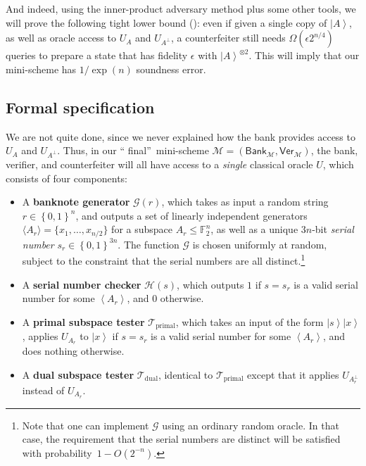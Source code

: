 And indeed, using the inner-product adversary method plus some other tools, we
will prove the following tight lower bound (): even
if given a single copy of $\left\vert A\right\rangle $, as well as oracle
access to $U_{A}$ and $U_{A^{\bot}}$, a counterfeiter still needs
$\Omega\left(\epsilon2^{n/4}\right)$ queries to prepare a state that
has fidelity $\epsilon$ with $\left\vert A\right\rangle ^{\otimes2}%
$. This will imply that our mini-scheme has $1/\exp(n)$ soundness error.

\subsection{Formal specification\label{SPEC}}

We are not quite done, since we never explained how the bank provides access
to $U_{A}$ and $U_{A^{\bot}}$. Thus, in our \textquotedblleft
final\textquotedblright\ mini-scheme $\mathcal{M}=\left(  \mathsf{Bank}%
_{\mathcal{M}},\mathsf{Ver}_{\mathcal{M}}\right)  $, the bank, verifier, and
counterfeiter will all have access to a \emph{single} classical oracle $U$,
which consists of four components:

\begin{itemize}
\item A \textbf{banknote generator} $\mathcal{G}\left(  r\right)  $, which
takes as input a random string $r\in\left\{  0,1\right\}  ^{n}$, and outputs a
set of linearly independent generators $\langle A_{r}\rangle
=\{  x_{1},\ldots,x_{n/2}\}  $ for a subspace $A_{r}\leq
\mathbb{F}_{2}^{n}$, as well as a unique $3n$-bit \emph{serial number}
$s_{r}\in\left\{  0,1\right\}  ^{3n}$. The function $\mathcal{G}$ is chosen
uniformly at random, subject to the constraint that the serial numbers are all
distinct.\footnote{Note that one can implement $\mathcal{G}$ using an
ordinary random oracle. In that case, the requirement that the serial
numbers are distinct will be satisfied with probability\ $1-O\left(
2^{-n}\right)  $.}

\item A \textbf{serial number checker} $\mathcal{H}\left(  s\right)  $, which
outputs $1$ if $s=s_{r}$ is a valid serial number for some $\left\langle
A_{r}\right\rangle $, and $0$ otherwise.

\item A \textbf{primal subspace tester} $\mathcal{T}_{\operatorname*{primal}}%
$, which takes an input of the form $\left\vert s\right\rangle \left\vert
x\right\rangle $, applies $U_{A_{r}}$ to $\left\vert x\right\rangle $ if
$s=s_{r}$ is a valid serial number for some $\left\langle A_{r}\right\rangle
$, and does nothing otherwise.

\item A \textbf{dual subspace tester} $\mathcal{T}_{\operatorname*{dual}}$,
identical to $\mathcal{T}_{\operatorname*{primal}}$ except that it applies
$U_{A_{r}^{\bot}}$ instead of $U_{A_{r}}$.
\end{itemize}

